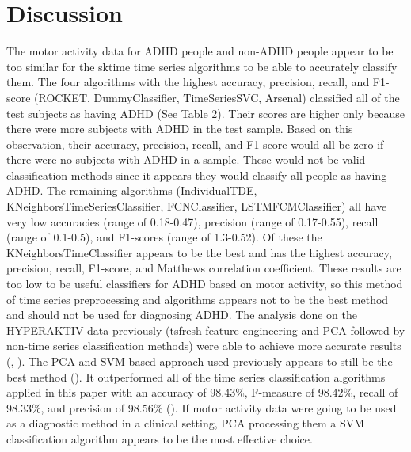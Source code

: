 \documentclass[,article,,moreauthors,pdftex]{mdpi}
\begin{document}
\hypertarget{discussion}{%
\section{Discussion}\label{discussion}}

The motor activity data for ADHD people and non-ADHD people appear to be
too similar for the sktime time series algorithms to be able to
accurately classify them. The four algorithms with the highest accuracy,
precision, recall, and F1-score (ROCKET, DummyClassifier, TimeSeriesSVC,
Arsenal) classified all of the test subjects as having ADHD (See Table
2). Their scores are higher only because there were more subjects with
ADHD in the test sample. Based on this observation, their accuracy,
precision, recall, and F1-score would all be zero if there were no
subjects with ADHD in a sample. These would not be valid classification
methods since it appears they would classify all people as having ADHD.
The remaining algorithms (IndividualTDE, KNeighborsTimeSeriesClassifier,
FCNClassifier, LSTMFCMClassifier) all have very low accuracies (range of
0.18-0.47), precision (range of 0.17-0.55), recall (range of 0.1-0.5),
and F1-scores (range of 1.3-0.52). Of these the KNeighborsTimeClassifier
appears to be the best and has the highest accuracy, precision, recall,
F1-score, and Matthews correlation coefficient. These results are too
low to be useful classifiers for ADHD based on motor activity, so this
method of time series preprocessing and algorithms appears not to be the
best method and should not be used for diagnosing ADHD. The analysis
done on the HYPERAKTIV data previously (tsfresh feature engineering and
PCA followed by non-time series classification methods) were able to
achieve more accurate results (\citet{10.1145/3458305.3478454},
\citet{kaur_accurate_2022}). The PCA and SVM based approach used
previously appears to still be the best method
(\citet{kaur_accurate_2022}). It outperformed all of the time series
classification algorithms applied in this paper with an accuracy of
98.43\%, F-measure of 98.42\%, recall of 98.33\%, and precision of
98.56\% (\citet{kaur_accurate_2022}). If motor activity data were going
to be used as a diagnostic method in a clinical setting, PCA processing
them a SVM classification algorithm appears to be the most effective
choice.
\end{document}
